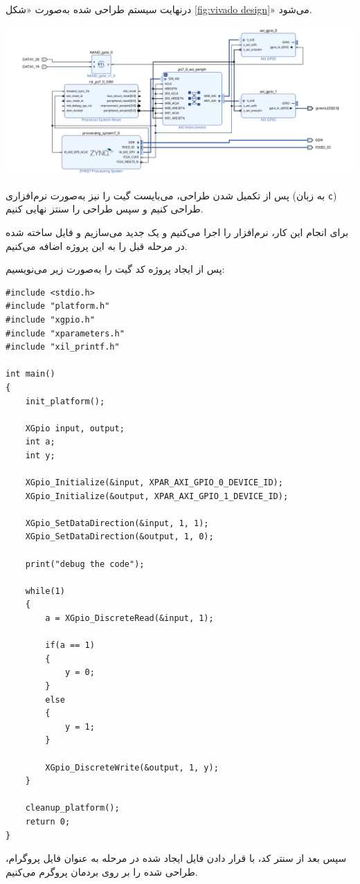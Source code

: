 درنهایت سیستم طراحی شده به‌صورت «شکل \ref{fig:vivado design}» می‌شود. 

\begin{center}
	\includegraphics*[width=1\linewidth]{pics/img3.png}
	\label{fig:vivado design}
\end{center}

پس از تکمیل شدن طراحی، می‌بایست گیت  را نیز به‌صورت نرم‌افزاری (به زبان \texttt{c}) طراحی کنیم و سپس طراحی را سنتز نهایی کنیم.

برای انجام این کار، نرم‌افزار  را اجرا می‌کنیم و یک  جدید می‌سازیم و فایل \texttt{} ساخته شده در  مرحله قبل را به این پروژه اضافه می‌کنیم.

پس از ایجاد پروژه کد گیت  را به‌صورت زیر می‌نویسیم:

\begin{latin}
\begin{lstlisting}[label=case_sens, caption=Not Module for PS]
#include <stdio.h>
#include "platform.h"
#include "xgpio.h"
#include "xparameters.h"
#include "xil_printf.h"

int main()
{
	init_platform();
	
	XGpio input, output;
	int a;
	int y;
	
	XGpio_Initialize(&input, XPAR_AXI_GPIO_0_DEVICE_ID);
	XGpio_Initialize(&output, XPAR_AXI_GPIO_1_DEVICE_ID);
	
	XGpio_SetDataDirection(&input, 1, 1);
	XGpio_SetDataDirection(&output, 1, 0);
	
	print("debug the code");
	
	while(1)
	{
		a = XGpio_DiscreteRead(&input, 1);
		
		if(a == 1)
		{
			y = 0;
		}
		else
		{
			y = 1;
		}
		
		XGpio_DiscreteWrite(&output, 1, y);
	}
	
	cleanup_platform();
	return 0;
}
\end{lstlisting} 
\end{latin}



سپس بعد از سنتر کد، با قرار دادن فایل  ایجاد شده در مرحله  به عنوان فایل پروگرام، طراحی  شده را بر روی بردمان پروگرم می‌کنیم.



